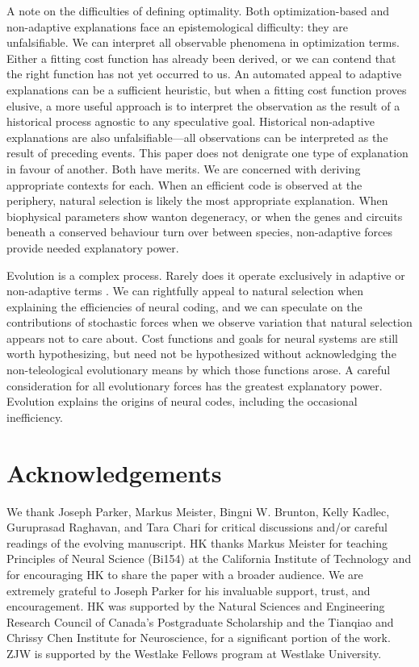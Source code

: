 \documentclass[twocolumn]{article}
\begin{document}
A note on the difficulties of defining optimality. Both optimization-based and non-adaptive explanations face an epistemological difficulty: they are unfalsifiable. We can interpret all observable phenomena in optimization terms. Either a fitting cost function has already been derived, or we can contend that the right function has not yet occurred to us. An automated appeal to adaptive explanations can be a sufficient heuristic, but when a fitting cost function proves elusive, a more useful approach is to interpret the observation as the result of a historical process agnostic to any speculative goal. Historical non-adaptive explanations are also unfalsifiable---all observations can be interpreted as the result of preceding events. This paper does not denigrate one type of explanation in favour of another. Both have merits. We are concerned with deriving appropriate contexts for each. When an efficient code is observed at the periphery, natural selection is likely the most appropriate explanation. When biophysical parameters show wanton degeneracy, or when the genes and circuits beneath a conserved behaviour turn over between species, non-adaptive forces provide needed explanatory power.

Evolution is a complex process. Rarely does it operate exclusively in adaptive or non-adaptive terms \cite{Gould_Lewontin_1979}. We can rightfully appeal to natural selection when explaining the efficiencies of neural coding, and we can speculate on the contributions of stochastic forces when we observe variation that natural selection appears not to care about. Cost functions and goals for neural systems are still worth hypothesizing, but need not be hypothesized without acknowledging the non-teleological evolutionary means by which those functions arose. A careful consideration for all evolutionary forces has the greatest explanatory power. Evolution explains the origins of neural codes, including the occasional inefficiency.

\newpage
\section*{Acknowledgements}
We thank Joseph Parker, Markus Meister, Bingni W. Brunton, Kelly Kadlec, Guruprasad Raghavan, and Tara Chari for critical discussions and/or careful readings of the evolving manuscript. HK thanks Markus Meister for teaching Principles of Neural Science (Bi154) at the California Institute of Technology and for encouraging HK to share the paper with a broader audience. We are extremely grateful to Joseph Parker for his invaluable support, trust, and encouragement. HK was supported by the Natural Sciences and Engineering Research Council of Canada's Postgraduate Scholarship and the Tianqiao and Chrissy Chen Institute for Neuroscience, for a significant portion of the work. ZJW is supported by the Westlake Fellows program at Westlake University.
\end{document}

